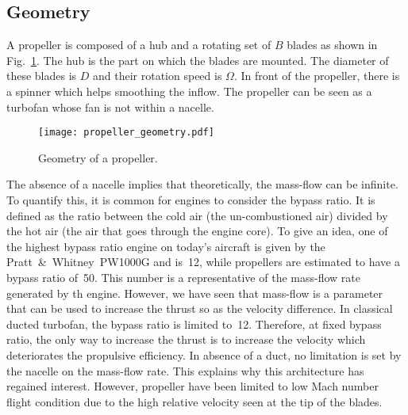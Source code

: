 
\subsection{Geometry}
\label{sub:cror_propeller_geometry}

A propeller is composed of a hub and a rotating set of 
$B$ blades as shown in
Fig.~\ref{fig:cror_propeller_geometry}. The hub
is the part on which the blades are mounted.
The diameter of these blades is $D$
and their rotation speed is $\Omega$. 
In front of the propeller, there is a spinner which helps
smoothing the inflow.
The propeller can be seen as
a turbofan whose fan is not within a nacelle.
\begin{figure}[htb]
  \centering
  \texttt{[image: propeller\_geometry.pdf]}
  \caption{Geometry of a propeller.}
  \label{fig:cror_propeller_geometry}
\end{figure}
The absence of a nacelle implies that theoretically, the mass-flow can be
infinite. To quantify this, it is common for engines to
consider the bypass ratio. It is defined as the ratio between the
cold air (the un-combustioned air)
divided by the hot air (the air that goes through the engine core).
To give an idea, one of the highest bypass ratio engine on today's aircraft is given
by the Pratt~\&~Whitney~PW1000G and is~12, while propellers are estimated
to have a bypass ratio of~50. 
This number is a representative of the mass-flow rate generated by th engine.
However, we have seen that mass-flow is a parameter that can be used to increase
the thrust so as the velocity difference. In classical ducted turbofan, the bypass ratio
is limited to~12. Therefore, at fixed bypass ratio, the only
way to increase the thrust is to increase the 
velocity which deteriorates the propulsive efficiency. In absence of a duct,
no limitation is set by the nacelle on the mass-flow rate.
This explains why this architecture has
regained interest. However, propeller
have been limited to low Mach number flight condition
due to the high relative velocity seen at the tip of the blades.

